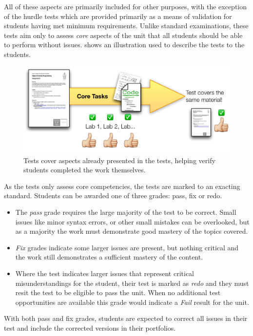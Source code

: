 All of these aspects are primarily included for other purposes, with the exception of the hurdle tests which are provided primarily as a means of validation for students having met minimum requirements. Unlike standard examinations, these tests aim only to assess \emph{core} aspects of the unit that all students should be able to perform without issues.  shows an illustration used to describe the tests to the students.

\begin{figure}[htbp]
	\centering
	\includegraphics[width=\textwidth]{Tests}
	\caption{Tests cover aspects already presented in the tests, helping verify students completed the work themselves.}
	\label{fig:tests}
\end{figure}

As the tests only assess core competencies, the tests are marked to an exacting standard. Students can be awarded one of three grades: pass, fix or redo. 
\begin{itemize}[noitemsep,nolistsep]
	\item The \emph{pass} grade requires the large majority of the test to be correct. Small issues like minor syntax errors, or other small mistakes can be overlooked, but as a majority the work must demonstrate good mastery of the topics covered. 
	\item \emph{Fix} grades indicate some larger issues are present, but nothing critical and the work still demonstrates a sufficient mastery of the content.
	\item Where the test indicates larger issues that represent critical misunderstandings for the student, their test is marked as \emph{redo} and they must resit the test to be eligible to pass the unit. When no additional test opportunities are available this grade would indicate a \emph{Fail} result for the unit.
\end{itemize}
With both pass and fix grades, students are expected to correct all issues in their test and include the corrected versions in their portfolios. 

